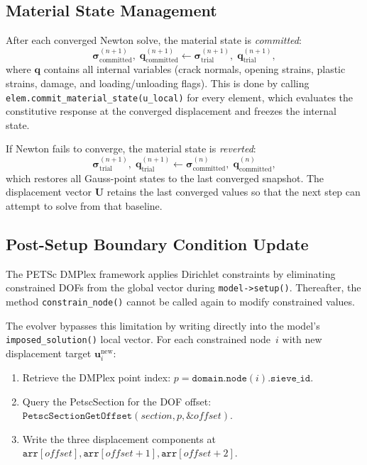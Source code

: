\subsection{Material State Management}
\label{ssec:nlevo-material-state}

After each converged Newton solve, the material state is
\emph{committed}:
\begin{equation}
  \boldsymbol{\sigma}^{(n+1)}_{\mathrm{committed}},\;
  \mathbf{q}^{(n+1)}_{\mathrm{committed}}
  \leftarrow
  \boldsymbol{\sigma}^{(n+1)}_{\mathrm{trial}},\;
  \mathbf{q}^{(n+1)}_{\mathrm{trial}},
  \label{eq:nlevo-commit}
\end{equation}
where $\mathbf{q}$ contains all internal variables (crack normals,
opening strains, plastic strains, damage, and loading/unloading
flags).  This is done by calling
\texttt{elem.commit\_material\_state(u\_local)} for every element, which
evaluates the constitutive response at the converged displacement and
freezes the internal state.

If Newton fails to converge, the material state is \emph{reverted}:
\begin{equation}
  \boldsymbol{\sigma}^{(n+1)}_{\mathrm{trial}},\;
  \mathbf{q}^{(n+1)}_{\mathrm{trial}}
  \leftarrow
  \boldsymbol{\sigma}^{(n)}_{\mathrm{committed}},\;
  \mathbf{q}^{(n)}_{\mathrm{committed}},
  \label{eq:nlevo-revert}
\end{equation}
which restores all Gauss-point states to the last converged snapshot.
The displacement vector $\mathbf{U}$ retains the last converged
values so that the next step can attempt to solve from that baseline.


\subsection{Post-Setup Boundary Condition Update}
\label{ssec:nlevo-bc-update}

The PETSc DMPlex framework applies Dirichlet constraints by
eliminating constrained DOFs from the global vector during
\texttt{model->setup()}.  Thereafter, the method
\texttt{constrain\_node()} cannot be called again to modify
constrained values.

The evolver bypasses this limitation by writing directly into the
model's \texttt{imposed\_solution()} local vector.  For each
constrained node~$i$ with new displacement target
$\mathbf{u}_i^{\mathrm{new}}$:
\begin{enumerate}
  \item Retrieve the DMPlex point index:
        $p = \texttt{domain.node}(i).\texttt{sieve\_id}$.
  \item Query the PetscSection for the DOF offset:
        $\texttt{PetscSectionGetOffset}(section, p, \&offset)$.
  \item Write the three displacement components at
        $\texttt{arr}[offset], \texttt{arr}[offset{+}1],
         \texttt{arr}[offset{+}2]$.
\end{enumerate}

